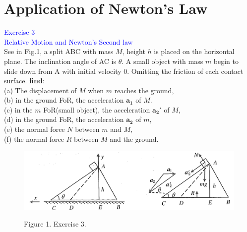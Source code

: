 \documentclass{beamer}
\begin{document}
\section{Application of Newton's Law}
\begin{frame}
\textcolor{blue}{Exercise 3}\\
\textcolor{blue}{\footnotesize{Relative Motion and Newton's Second law}}\\

See in Fig.1, a split ABC with mass $M$, height $h$ is placed on the horizontal plane. The inclination angle of AC is $\theta$. A small object with mass $m$ begin to slide down from A with initial velocity 0. Omitting the friction of each contact surface. \textbf{find}:\\
(a) The displacement of $M$ when $m$ reaches the ground,\\
(b) in the ground FoR, the acceleration $\mathbf{a_1}$ of $M$.\\
(c) in the $m$ FoR(small object), the acceleration $\mathbf{a_2'}$ of $M$,\\
(d) in the ground FoR, the acceleration $\mathbf{a_2}$ of $m$,\\
(e) the normal force $N$ between $m$ and $M$,\\
(f) the normal force $R$ between $M$ and the ground.
\end{frame}

\begin{frame}
  \begin{figure}[htbp]
    \centering
    \includegraphics[width=1 \linewidth, angle =0]{ex3.png}
    \begin{center}
      Figure 1. Exercise 3.
      \end{center}
    \label{3}
    \end{figure}
\end{frame}
\end{document}
